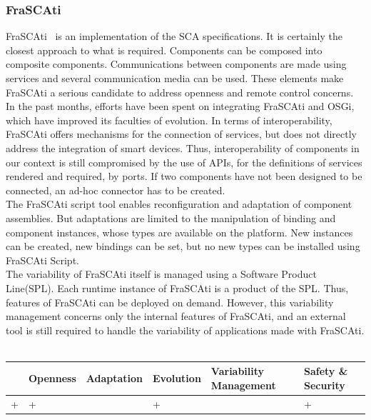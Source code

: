 \subsubsection{FraSCAti}

FraSCAti~\cite{Melisson:2010} is an implementation of the SCA specifications. It is certainly the closest approach to what is required. Components can be composed into composite components. Communications between components are made using services and several communication media can be used. These elements make FraSCAti a serious candidate to address openness and remote control concerns.\\
In the past months, efforts have been spent on integrating FraSCAti and OSGi, which have improved its faculties of evolution. In terms of interoperability, FraSCAti offers mechanisms for the connection of services, but does not directly address the integration of smart devices. Thus, interoperability of components in our context is still compromised by the use of APIs, for the definitions of services rendered and required, by ports. If two components have not been designed to be connected, an ad-hoc connector has to be created.\\
The FraSCAti script tool enables reconfiguration and adaptation of component assemblies. But adaptations are limited to the manipulation of binding and component instances, whose types are available on the platform. New instances can be created, new bindings can be set, but no new types can be installed using FraSCAti Script.\\
The variability of FraSCAti itself is managed using a Software Product Line(SPL). Each runtime instance of FraSCAti is a product of the SPL. Thus, features of FraSCAti can be deployed on demand. However, this variability management concerns only the internal features of FraSCAti, and an external tool is still required to handle the variability of applications made with FraSCAti.\\
\\
\begin{tabular}{ >{\centering}m{}| >{\centering}m{} >{\centering}m{}| >{\centering}m{} >{\centering}m{}| >{\centering\arraybackslash}m{}}
{\tiny Interoperability} & {\tiny Openness} & {\tiny Adaptation} & {\tiny Evolution} & {\tiny Variability Management} & {\tiny Safety \& Security}\\
 \hline
 + & + &  & + &  & + \\ 
  \hline
\end{tabular}\\

